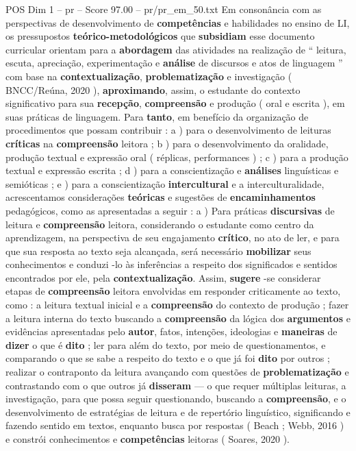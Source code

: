 \begin{textsample}{POS Dim 1 – pr – Score 97.00 – pr/pr\_em\_50.txt}
Em consonância com as perspectivas de desenvolvimento de \textbf{competências} e habilidades no ensino de LI, os pressupostos \textbf{teórico-metodológicos} que \textbf{subsidiam} esse documento curricular orientam para a \textbf{abordagem} das atividades na realização de “ leitura, escuta, apreciação, experimentação e \textbf{análise} de discursos e atos de linguagem ” com base na \textbf{contextualização}, \textbf{problematização} e investigação ( BNCC/Reúna, 2020 ), \textbf{aproximando}, assim, o estudante do contexto significativo para sua \textbf{recepção}, \textbf{compreensão} e produção ( oral e escrita ), em suas práticas de linguagem.
Para \textbf{tanto}, em benefício da organização de procedimentos que possam contribuir : a ) para o desenvolvimento de leituras \textbf{críticas} na \textbf{compreensão} leitora ; b ) para o desenvolvimento da oralidade, produção textual e expressão oral ( réplicas, performances ) ; c ) para a produção textual e expressão escrita ; d ) para a conscientização e \textbf{análises} linguísticas e semióticas ; e ) para a conscientização \textbf{intercultural} e a interculturalidade, acrescentamos considerações \textbf{teóricas} e sugestões de \textbf{encaminhamentos} pedagógicos, como as apresentadas a seguir : a ) Para práticas \textbf{discursivas} de leitura e \textbf{compreensão} leitora, considerando o estudante como centro da aprendizagem, na perspectiva de seu engajamento \textbf{crítico}, no ato de ler, e para que sua resposta ao texto seja alcançada, será necessário \textbf{mobilizar} seus conhecimentos e conduzi -lo às inferências a respeito dos significados e sentidos encontrados por ele, pela \textbf{contextualização}.
Assim, \textbf{sugere} -se considerar etapas de \textbf{compreensão} leitora envolvidas em responder criticamente ao texto, como : a leitura textual inicial e a \textbf{compreensão} do contexto de produção ; fazer a leitura interna do texto buscando a \textbf{compreensão} da lógica dos \textbf{argumentos} e evidências apresentadas pelo \textbf{autor}, fatos, intenções, ideologias e \textbf{maneiras} de \textbf{dizer} o que é \textbf{dito} ; ler para além do texto, por meio de questionamentos, e comparando o que se sabe a respeito do texto e o que já foi \textbf{dito} por outros ; realizar o contraponto da leitura avançando com questões de \textbf{problematização} e contrastando com o que outros já \textbf{disseram} — o que requer múltiplas leituras, a investigação, para que possa seguir questionando, buscando a \textbf{compreensão}, e o desenvolvimento de estratégias de leitura e de repertório linguístico, significando e fazendo sentido em textos, enquanto busca por respostas ( Beach ; Webb, 2016 ) e constrói conhecimentos e \textbf{competências} leitoras ( Soares, 2020 ).

\end{textsample}
